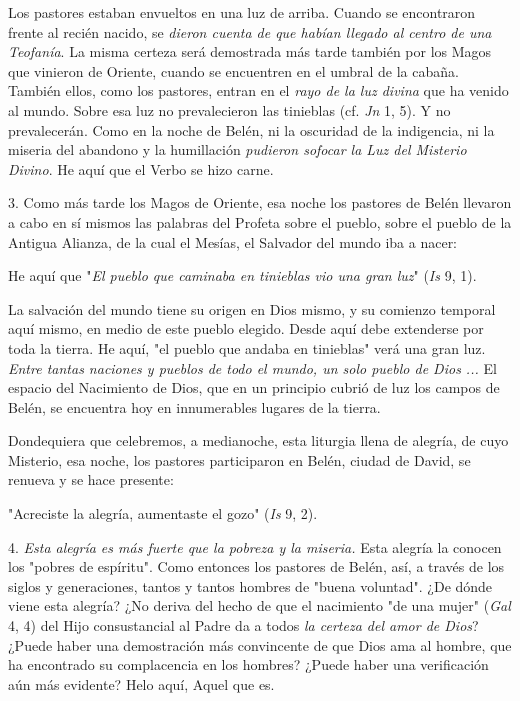 \begin{body}
\begin{body}
Los pastores estaban envueltos en una luz de arriba. Cuando se encontraron frente al recién nacido, se \emph{dieron cuenta de que habían llegado al centro de una Teofanía}. La misma certeza será demostrada más tarde también por los Magos que vinieron de Oriente, cuando se encuentren en el umbral de la cabaña. También ellos, como los pastores, entran en el \emph{rayo de la luz divina} que ha venido al mundo. Sobre esa luz no prevalecieron las tinieblas (cf. \emph{Jn} 1, 5). Y no prevalecerán. Como en la noche de Belén, ni la oscuridad de la indigencia, ni la miseria del abandono y la humillación \emph{pudieron sofocar la Luz del Misterio Divino}. He aquí que el Verbo se hizo carne.

3. Como más tarde los Magos de Oriente, esa noche los pastores de Belén llevaron a cabo en sí mismos las palabras del Profeta sobre el pueblo, sobre el pueblo de la Antigua Alianza, de la cual el Mesías, el Salvador del mundo iba a nacer:

He aquí que "\emph{El pueblo que caminaba en tinieblas vio una gran luz}" (\emph{Is} 9, 1).

La salvación del mundo tiene su origen en Dios mismo, y su comienzo temporal aquí mismo, en medio de este pueblo elegido. Desde aquí debe extenderse por toda la tierra. He aquí, "el pueblo que andaba en tinieblas" verá una gran luz. \emph{Entre tantas naciones y pueblos de todo el mundo, un solo pueblo de Dios ...} El espacio del Nacimiento de Dios, que en un principio cubrió de luz los campos de Belén, se encuentra hoy en innumerables lugares de la tierra.

Dondequiera que celebremos, a medianoche, esta liturgia llena de alegría, de cuyo Misterio, esa noche, los pastores participaron en Belén, ciudad de David, se renueva y se hace presente:

"Acreciste la alegría, aumentaste el gozo" (\emph{Is} 9, 2).

4. \emph{Esta alegría es más fuerte que la pobreza y la miseria.} Esta alegría la conocen los "pobres de espíritu". Como entonces los pastores de Belén, así, a través de los siglos y generaciones, tantos y tantos hombres de "buena voluntad". ¿De dónde viene esta alegría? ¿No deriva del hecho de que el nacimiento "de una mujer" (\emph{Gal} 4, 4) del Hijo consustancial al Padre da a todos \emph{la certeza del amor de Dios}? ¿Puede haber una demostración más convincente de que Dios ama al hombre, que ha encontrado su complacencia en los hombres? ¿Puede haber una verificación aún más evidente? Helo aquí, Aquel que es.


\end{body}
\end{body}
